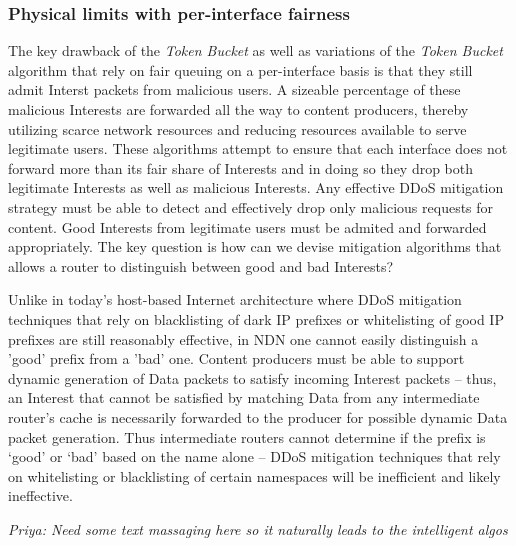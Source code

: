 \subsubsection{\textbf{Physical limits with per-interface fairness}}
\label{sec:queuing}




The key drawback of the {\it Token Bucket} as well as variations of the {\it Token Bucket} algorithm that rely on fair queuing on a per-interface basis is that they still admit Interst packets from malicious users. A sizeable percentage of these malicious Interests are forwarded all the way to content producers, thereby utilizing scarce network resources and reducing resources available to serve legitimate users.  These algorithms attempt to ensure that each interface does not forward more than its fair share of Interests and in doing so they drop both legitimate Interests as well as malicious Interests. Any effective DDoS  mitigation strategy must be able to detect and effectively drop only malicious requests for content. Good Interests from legitimate users must be admited and forwarded appropriately. The key question is how can we devise mitigation algorithms that allows a router to distinguish between good and bad Interests? 

Unlike in today's host-based Internet architecture where DDoS mitigation techniques that rely on blacklisting of dark IP prefixes or whitelisting of good IP prefixes are still reasonably effective, in NDN one cannot easily distinguish a 'good' prefix from a 'bad' one. Content producers must be able to support dynamic generation of Data packets to satisfy incoming Interest packets -- thus, an Interest that cannot be satisfied by matching Data from any intermediate router's cache is necessarily forwarded to the producer for possible dynamic Data packet generation. Thus intermediate routers cannot determine if the prefix is `good' or `bad' based on the name alone -- DDoS mitigation techniques that rely on whitelisting or blacklisting of certain namespaces  will be inefficient and likely ineffective. 

{\it Priya: Need some text massaging here so it naturally leads to the intelligent algos}
